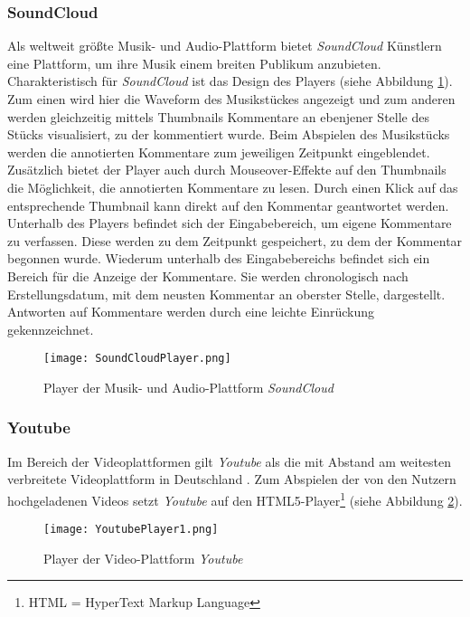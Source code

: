 \subsubsection{SoundCloud}

\glqq Als weltweit größte Musik- und Audio-Plattform\grqq{} \citep{soundcloudinfo} bietet \textit{SoundCloud} Künstlern eine Plattform, um ihre Musik einem breiten Publikum anzubieten. Charakteristisch für \textit{SoundCloud} ist das Design des Players (siehe Abbildung \ref{fig:SoundCloudPlayer}). Zum einen wird hier die Waveform des Musikstückes angezeigt und zum anderen werden gleichzeitig mittels Thumbnails Kommentare an ebenjener Stelle des Stücks visualisiert, zu der kommentiert wurde. Beim Abspielen des Musikstücks werden die annotierten Kommentare zum jeweiligen Zeitpunkt eingeblendet. Zusätzlich bietet der Player auch durch Mouseover-Effekte auf den Thumbnails die Möglichkeit, die annotierten Kommentare zu lesen. Durch einen Klick auf das entsprechende Thumbnail kann direkt auf den Kommentar geantwortet werden. Unterhalb des Players befindet sich der Eingabebereich, um eigene Kommentare zu verfassen. Diese werden zu dem Zeitpunkt gespeichert, zu dem der Kommentar begonnen wurde. Wiederum unterhalb des Eingabebereichs befindet sich ein Bereich für die Anzeige der Kommentare. Sie werden chronologisch nach Erstellungsdatum, mit dem neusten Kommentar an oberster Stelle, dargestellt. Antworten auf Kommentare werden durch eine leichte Einrückung gekennzeichnet.

\begin{figure}[h!]
\texttt{[image: SoundCloudPlayer.png]}
\caption{\label{fig:SoundCloudPlayer}Player der Musik- und Audio-Plattform \textit{SoundCloud} \citep{SoundCloud2015Panic}}
\end{figure}

\subsubsection{Youtube}
 
Im Bereich der Videoplattformen gilt \textit{Youtube} als die mit Abstand am weitesten verbreitete Videoplattform in Deutschland \citep{statista2016video}.  Zum Abspielen der von den Nutzern hochgeladenen Videos setzt \textit{Youtube} auf den HTML5-Player\footnote{HTML = HyperText Markup Language} (siehe Abbildung \ref{fig:YoutubePlayer1}).

\begin{figure}[h!]
\texttt{[image: YoutubePlayer1.png]}
\caption{\label{fig:YoutubePlayer1}Player der Video-Plattform \textit{Youtube} \citep{Youtube2015Panic}}
\end{figure}

